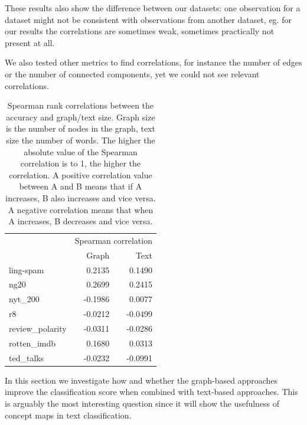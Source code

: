 These results also show the difference between our datasets: one observation for a dataset might not be consistent with observations from another dataset, eg. for our results the correlations are sometimes weak, sometimes practically not present at all.

We also tested other metrics to find correlations, for instance the number of edges or the number of connected components, yet we could not see relevant correlations.

\begin{table}[htb!]
	\centering
	\begin{tabular}{lrr}
		&  \multicolumn{2}{c}{Spearman correlation} \\
		&  Graph &  Text \\
		\midrule
		ling-spam       &  0.2135 &  0.1490 \\
		ng20            &  0.2699 &  0.2415 \\
		nyt\_200         & -0.1986 &  0.0077 \\
		r8              & -0.0212 & -0.0499 \\
		review\_polarity & -0.0311 & -0.0286 \\
		rotten\_imdb     &  0.1680 &  0.0313 \\
		ted\_talks       & -0.0232 & -0.0991 \\
		\bottomrule
	\end{tabular}
	\caption[Table: Graph/text size correlations]{Spearman rank correlations between the accuracy and graph/text size. Graph size is the number of nodes in the graph, text size the number of words. The higher the absolute value of the Spearman correlation is to 1, the higher the correlation.
	A positive correlation value between A and B means that if A increases, B also increases and vice versa.
	A negative correlation means that when A increases, B decreases and vice versa.}%
	\label{table:correlations_size}
\end{table}


In this section we investigate how and whether the graph-based approaches improve the classification score when combined with text-based approaches.
This is arguably the most interesting question since it will show the usefulness of concept maps in text classification.

